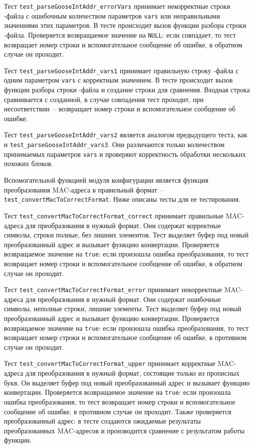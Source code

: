Тест \lstinline{test_parseGooseIntAddr_errorVars} принимает некорректные строки \cid-файла с ошибочным количеством параметров \lstinline{vars} или неправильными значениями этих параметров. В тесте происходит вызов функции разбора строки \cid-файла. Проверяется возвращаемое значение на \lstinline{NULL}: если совпадает, то тест возвращает номер строки и вспомогательное сообщение об ошибке, в обратном случае он проходит.

Тест \lstinline{test_parseGooseIntAddr_vars1} принимает правильную строку \cid-файла с одним параметром \lstinline{vars} с корректным значением. В тесте происходит вызов функции разбора строки \cid-файла и создание строки для сравнения. Входная строка сравнивается с созданной, в случае совпадения тест проходит, при несоответствии~-- возвращает номер строки и вспомогательное сообщение об ошибке.

Тест \lstinline{test_parseGooseIntAddr_vars2} является аналогом предыдущего
теста, как и \lstinline{test_parseGooseIntAddr_vars3}.
Они различаются только количеством принимаемых параметров \lstinline{vars} и проверяют корректность
обработки нескольких похожих блоков.

Вспомогательной функцией модуля конфигурации является функция преобразования MAC-адреса в правильный формат~-- \lstinline{test_convertMacToCorrectFormat}. Ниже описаны тесты для ее тестирования.

Тест \lstinline{test_convertMacToCorrectFormat_correct} принимает правильные MAC-адреса для преобразования в нужный формат. Они содержат корректные символы, строки полные, без лишних элементов. Тест выделяет буфер под новый преобразованный адрес и вызывает функцию конвертации. Проверяется возвращаемое значение на \lstinline{true}: если произошла ошибка преобразования, то тест возвращает номер строки и вспомогательное сообщение об ошибке, в обратном случае он проходит.

Тест \lstinline{test_convertMacToCorrectFormat_error} принимает некорректные MAC-адреса для преобразования в нужный формат. Они содержат ошибочные символы, неполные строки, лишние элементы. Тест выделяет буфер под новый преобразованный адрес и вызывает функцию конвертации. Проверяется возвращаемое значение на \lstinline{true}: если произошла ошибка преобразования, то тест возвращает номер строки и вспомогательное сообщение об ошибке, в противном случае он проходит.

Тест \lstinline{test_convertMacToCorrectFormat_upper} принимает корректные MAC-адреса для преобразования в нужный формат, состоящие только из прописных букв. Он выделяет буфер под новый преобразованный адрес и вызывает функцию конвертации. Проверяется возвращаемое значение на \lstinline{true}: если произошла ошибка преобразования, то тест возвращает номер строки и вспомогательное сообщение об ошибке, в противном случае он проходит. Также проверяется преобразованный адрес: в тесте создаются ожидаемые результаты преобразованных MAC-адресов и производится сравнение с результатом работы функции.

